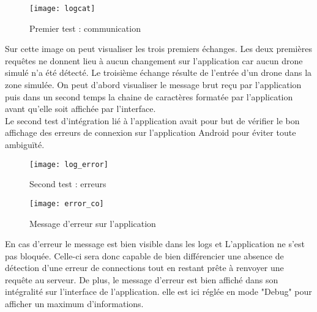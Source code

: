 \begin{figure}[!h]
  \centering
  \texttt{[image: logcat]}  
  \caption{Premier test : communication}
\end{figure}

Sur cette image on peut visualiser les trois premiers échanges. Les deux premières requêtes ne donnent lieu à aucun changement sur l'application car aucun drone simulé n'a été détecté.
Le troisième échange résulte de l'entrée d'un drone dans la zone simulée. On peut d'abord visualiser le message brut reçu par l'application puis dans un second temps la chaine de caractères formatée par l'application avant qu'elle soit affichée par l'interface.
~\\
Le second test d'intégration lié à l'application avait pour but de vérifier le bon affichage des erreurs de connexion sur l'application Android pour éviter toute ambiguïté. 

\begin{figure}[!h]
  \centering
  \texttt{[image: log\_error]}  
  \caption{Second test : erreurs}
\end{figure}

\newpage %

\begin{wrapfigure}{r}{0.5\textwidth}

  \texttt{[image: error\_co]}
  \caption{Message d'erreur sur l'application}
\end{wrapfigure}

En cas d'erreur le message est bien visible dans les logs et L'application ne s'est pas bloquée. Celle-ci sera donc capable de bien différencier une absence de détection d'une erreur de connections tout en restant prête à renvoyer une requête au serveur. De plus, le message d'erreur est bien affiché dans son intégralité sur l'interface de l'application. elle est ici réglée en mode "Debug" pour afficher un maximum d'informations.



